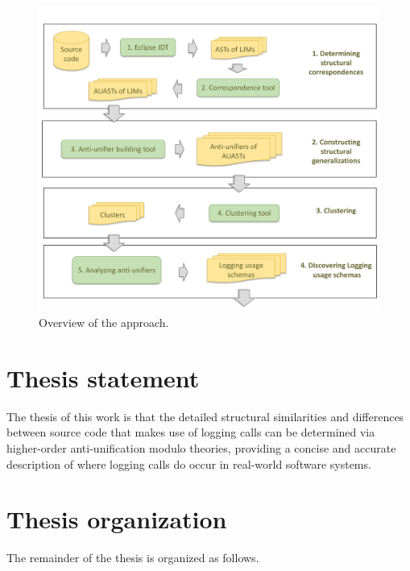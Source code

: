 \begin{figure} [t]
  \centering\includegraphics [width = \textwidth]{Drawing4/SystemOverview.pdf}
  \caption{Overview of the approach. \protect{}}
  \label{fig:system_overview}
\end{figure}


\section{Thesis statement} \label{intro-stmt}
The thesis of this work is that the detailed structural similarities and differences between source code that makes use of logging calls can be determined via higher-order anti-unification modulo theories, providing a concise and accurate description of where logging calls do occur in real-world software systems.

\section{Thesis organization} \label{intro-org}
The remainder of the thesis is organized as follows. 

